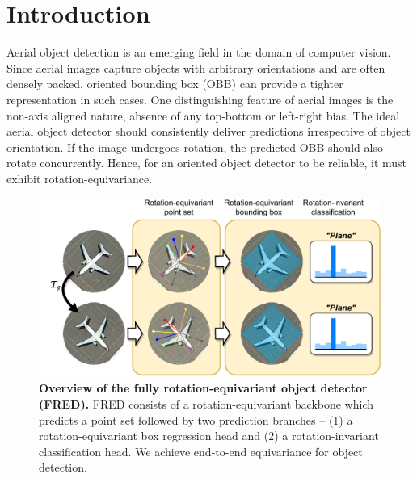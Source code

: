 \documentclass[letterpaper]{article} %
\begin{document}
\section{Introduction}
Aerial object detection is an emerging field in the domain of computer vision. Since aerial images capture objects with arbitrary orientations and are often densely packed, oriented bounding box (OBB) can provide a tighter representation in such cases. One distinguishing feature of aerial images is the non-axis aligned nature, absence of any top-bottom or left-right bias. The ideal aerial object detector should consistently deliver predictions irrespective of object orientation. If the image undergoes rotation, the predicted OBB should also rotate concurrently. Hence, for an oriented object detector to be reliable, it must exhibit rotation-equivariance.
\begin{figure}[t]
\centering
\includegraphics[width=\linewidth]{figs/figure1-v3.pdf}
\caption{\textbf{Overview of the fully rotation-equivariant object detector (FRED).} FRED consists of a rotation-equivariant backbone which predicts a point set followed by two prediction branches -- (1) a rotation-equivariant box regression head and (2) a rotation-invariant classification head. We achieve end-to-end equivariance for object detection.}
\label{fig:figure1}
\end{figure}
\end{document}
